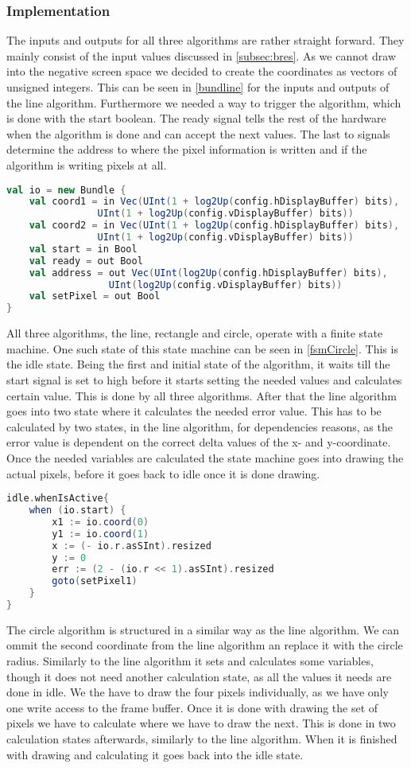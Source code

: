 \subsubsection*{Implementation}
The inputs and outputs for all three algorithms are rather straight forward. They mainly consist of the input values discussed in \cref{subsec:bres}. As we cannot draw into the negative screen space we decided to create the coordinates as vectors of unsigned integers. This can be seen in \cref{bundline} for the inputs and outputs of the line algorithm. Furthermore we needed a way to trigger the algorithm, which is done with the start boolean. The ready signal tells the rest of the hardware when the algorithm is done and can accept the next values. The last to signals determine the address to where the pixel information is written and if the algorithm is writing pixels at all.
\begin{lstlisting}[language=scala, caption={Line IOs}, label=bundline]
val io = new Bundle {
	val coord1 = in Vec(UInt(1 + log2Up(config.hDisplayBuffer) bits), 
			    UInt(1 + log2Up(config.vDisplayBuffer) bits))
	val coord2 = in Vec(UInt(1 + log2Up(config.hDisplayBuffer) bits), 
			    UInt(1 + log2Up(config.vDisplayBuffer) bits))
	val start = in Bool
	val ready = out Bool
	val address = out Vec(UInt(log2Up(config.hDisplayBuffer) bits), 
			      UInt(log2Up(config.vDisplayBuffer) bits))
	val setPixel = out Bool
}
\end{lstlisting}
All three algorithms, the line, rectangle and circle, operate with a finite state machine. One such state of this state machine can be seen in \cref{fsmCircle}. This is the idle state. Being the first and initial state of the algorithm, it waits till the start signal is set to high before it starts setting the needed values and calculates certain value. This is done by all three algorithms. After that the line algorithm goes into two state where it calculates the needed error value. This has to be calculated by two states, in the line algorithm, for dependencies reasons, as the error value is dependent on the correct delta values of the x- and y-coordinate. Once the needed variables are calculated the state machine goes into drawing the actual pixels, before it goes back to idle once it is done drawing.
\begin{lstlisting}[language=scala, caption={Start of the Circle Algorithm}, label=fsmCircle]
idle.whenIsActive{
	when (io.start) {
		x1 := io.coord(0)
		y1 := io.coord(1)
		x := (- io.r.asSInt).resized
		y := 0
		err := (2 - (io.r << 1).asSInt).resized
		goto(setPixel1)
	}
}
\end{lstlisting}
The circle algorithm is structured in a similar way as the line algorithm. We can ommit the second coordinate from the line algorithm an replace it with the circle radius. Similarly to the line algorithm it sets and calculates some variables, though it does not need another calculation state, as all the values it needs are done in idle. We the have to draw the four pixels individually, as we have only one write access to the frame buffer. Once it is done with drawing the set of pixels we have to calculate where we have to draw the next. This is done in two calculation states afterwards, similarly to the line algorithm. When it is finished with drawing and calculating it goes back into the idle state.
